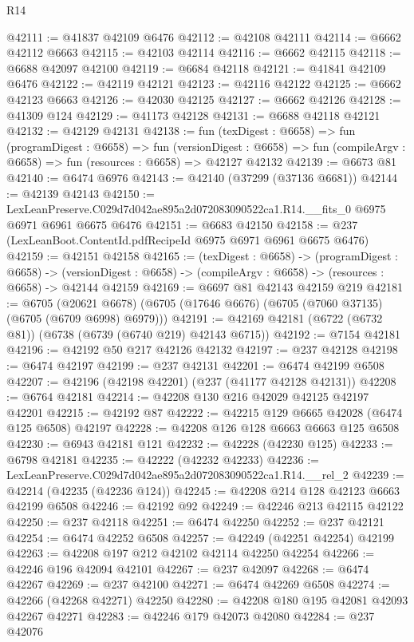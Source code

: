 \begin{lexlean}{R14}
\begin{coremodule}
@42111 := @41837 @42109 @6476
@42112 := @42108 @42111
@42114 := @6662 @42112 @6663
@42115 := @42103 @42114
@42116 := @6662 @42115
@42118 := @6688 @42097 @42100
@42119 := @6684 @42118
@42121 := @41841 @42109 @6476
@42122 := @42119 @42121
@42123 := @42116 @42122
@42125 := @6662 @42123 @6663
@42126 := @42030 @42125
@42127 := @6662 @42126
@42128 := @41309 @124
@42129 := @41173 @42128
@42131 := @6688 @42118 @42121
@42132 := @42129 @42131
@42138 := fun (texDigest : @6658) =>
  fun (programDigest : @6658) =>
  fun (versionDigest : @6658) =>
  fun (compileArgv : @6658) => fun (resources : @6658) => @42127 @42132
@42139 := @6673 @81
@42140 := @6474 @6976
@42143 := @42140 (@37299 (@37136 @6681))
@42144 := @42139 @42143
@42150 := LexLeanPreserve.C029d7d042ae895a2d072083090522ca1.R14.__fits_0
    @6975
    @6971
    @6961
    @6675
    @6476
@42151 := @6683 @42150
@42158 := @237 (LexLeanBoot.ContentId.pdfRecipeId @6975 @6971 @6961 @6675 @6476)
@42159 := @42151 @42158
@42165 := (texDigest : @6658) ->
  (programDigest : @6658) ->
  (versionDigest : @6658) -> (compileArgv : @6658) -> (resources : @6658) -> @42144 @42159
@42169 := @6697 @81 @42143 @42159 @219
@42181 := @6705
    (@20621 @6678)
    (@6705 (@17646 @6676) (@6705 (@7060 @37135) (@6705 (@6709 @6998) @6979)))
@42191 := @42169 @42181 (@6722 (@6732 @81)) (@6738 (@6739 (@6740 @219) @42143 @6715))
@42192 := @7154 @42181
@42196 := @42192 @50 @217 @42126 @42132
@42197 := @237 @42128
@42198 := @6474 @42197
@42199 := @237 @42131
@42201 := @6474 @42199 @6508
@42207 := @42196 (@42198 @42201) (@237 (@41177 @42128 @42131))
@42208 := @6764 @42181
@42214 := @42208 @130 @216 @42029 @42125 @42197 @42201
@42215 := @42192 @87
@42222 := @42215 @129 @6665 @42028 (@6474 @125 @6508) @42197
@42228 := @42208 @126 @128 @6663 @6663 @125 @6508
@42230 := @6943 @42181 @121
@42232 := @42228 (@42230 @125)
@42233 := @6798 @42181
@42235 := @42222 (@42232 @42233)
@42236 := LexLeanPreserve.C029d7d042ae895a2d072083090522ca1.R14.__rel_2
@42239 := @42214 (@42235 (@42236 @124))
@42245 := @42208 @214 @128 @42123 @6663 @42199 @6508
@42246 := @42192 @92
@42249 := @42246 @213 @42115 @42122
@42250 := @237 @42118
@42251 := @6474 @42250
@42252 := @237 @42121
@42254 := @6474 @42252 @6508
@42257 := @42249 (@42251 @42254) @42199
@42263 := @42208 @197 @212 @42102 @42114 @42250 @42254
@42266 := @42246 @196 @42094 @42101
@42267 := @237 @42097
@42268 := @6474 @42267
@42269 := @237 @42100
@42271 := @6474 @42269 @6508
@42274 := @42266 (@42268 @42271) @42250
@42280 := @42208 @180 @195 @42081 @42093 @42267 @42271
@42283 := @42246 @179 @42073 @42080
@42284 := @237 @42076

\end{coremodule}
\end{lexlean}
